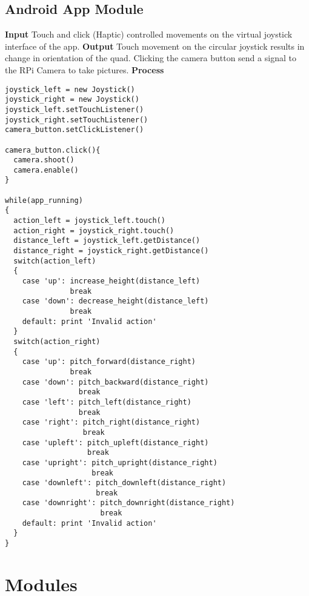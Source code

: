 \subsection{Android App Module}
\noindent
\textbf{Input}\newline
Touch and click (Haptic) controlled movements on the virtual joystick interface of the app. \newline \newline
\textbf{Output}\newline
Touch movement on the circular joystick results in change in orientation of the quad.
Clicking the camera button send a signal to the RPi Camera to take pictures.
\newline  \newline
\textbf{Process}
\begin{lstlisting}
joystick_left = new Joystick()
joystick_right = new Joystick()
joystick_left.setTouchListener()
joystick_right.setTouchListener()
camera_button.setClickListener()

camera_button.click(){
  camera.shoot()
  camera.enable()
}

while(app_running)
{
  action_left = joystick_left.touch()
  action_right = joystick_right.touch()
  distance_left = joystick_left.getDistance()
  distance_right = joystick_right.getDistance()
  switch(action_left)
  {
    case 'up': increase_height(distance_left)
               break
    case 'down': decrease_height(distance_left)
               break
    default: print 'Invalid action'
  }
  switch(action_right)
  {
    case 'up': pitch_forward(distance_right)
               break
    case 'down': pitch_backward(distance_right)
                 break
    case 'left': pitch_left(distance_right)
                 break
    case 'right': pitch_right(distance_right)
                  break
    case 'upleft': pitch_upleft(distance_right)
                   break
    case 'upright': pitch_upright(distance_right)
                    break
    case 'downleft': pitch_downleft(distance_right)
                     break
    case 'downright': pitch_downright(distance_right)
                      break
    default: print 'Invalid action'
  }
}
\end{lstlisting}


\section{Modules}
